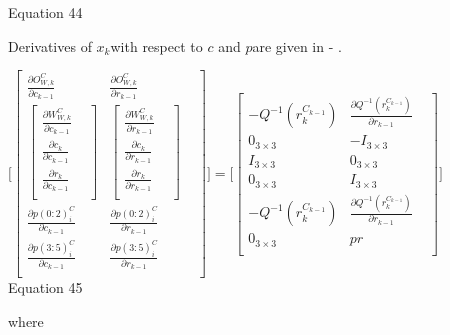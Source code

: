 Equation 44

Derivatives of $x_{k}$with respect to $c$ and $p$are given in - 
. 

$\lbrack \begin{bmatrix}
\frac{\partial O_{W,k}^{C}}{\partial c_{k-1}} & \frac{\partial 
O_{W,k}^{C}}{\partial r_{k-1}} & \\
\begin{bmatrix}
\frac{\partial W_{W,k}^{C}}{\partial c_{k-1}} & \\
\frac{\partial c_{k}}{\partial c_{k-1}} & \\
\frac{\partial r_{k}}{\partial c_{k-1}} & \\
\end{bmatrix}
 & \begin{bmatrix}
\frac{\partial W_{W,k}^{C}}{\partial r_{k-1}} & \\
\frac{\partial c_{k}}{\partial r_{k-1}} & \\
\frac{\partial r_{k}}{\partial r_{k-1}} & \\
\end{bmatrix}
 & \\
\frac{\partial p(0:2)_{i}^{C}}{\partial c_{k-1}} & \frac{\partial 
p(0:2)_{i}^{C}}{\partial r_{k-1}} & \\
\frac{\partial p(3:5)_{i}^{C}}{\partial c_{k-1}} & \frac{\partial 
p(3:5)_{i}^{C}}{\partial r_{k-1}} & \\
\end{bmatrix}
\rbrack =\lbrack \begin{bmatrix}
-Q^{-1}(r_{k}^{C_{k-1}}) & \frac{\partial 
Q^{-1}(r_{k}^{C_{k-1}})}{\partial r_{k-1}} & \\
0_{3\times 3} & -I_{3\times 3} & \\
I_{3\times 3} & 0_{3\times 3} & \\
0_{3\times 3} & I_{3\times 3} & \\
-Q^{-1}(r_{k}^{C_{k-1}}) & \frac{\partial 
Q^{-1}(r_{k}^{C_{k-1}})}{\partial r_{k-1}} & \\
0_{3\times 3} & pr & \\
\end{bmatrix}
\rbrack $\\


Equation 45

where

